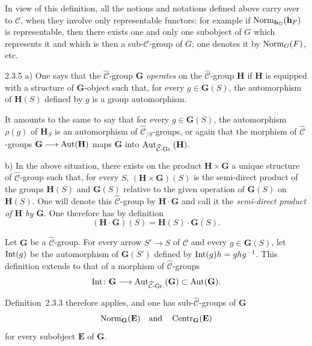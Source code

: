 In view of this definition, all the notions and notations defined above carry
over to \(\mathcal{C}\), when they involve only representable functors: for
example if \(\operatorname{Norm}_{\mathbf{h}_{G}}(\mathbf{h}_{F})\) is
representable, then there exists one and only one subobject of
\(G\) which represents it and which is then a
sub-\(\mathcal{C}\)-group of \(G\); one denotes it by
\(\operatorname{Norm}_{G}(F)\), etc.

\begin{definition}{2.3.5}\label{I.2.3.5}
a) One says that the \(\widehat{\mathcal{C}}\)-group \(\mathbf{G}\)
\emph{operates} on the \(\widehat{\mathcal{C}}\)-group \(\mathbf{H}\) if
\(\mathbf{H}\) is equipped with a structure of \(\mathbf{G}\)-object such
that, for every \(g\in\mathbf{G}(S)\), the automorphism of \(\mathbf{H}(S)\)
defined by \(g\) is a group automorphism.

It amounts to the same to say that for every \(g\in\mathbf{G}(S)\), the
automorphism \(\rho(g)\) of \(\mathbf{H}_{S}\) is an automorphism of
\(\widehat{\mathcal{C}}_{/S}\)-groups, or again that the morphism of
\(\widehat{\mathcal{C}}\)-groups
\(\mathbf{G}\longrightarrow\operatorname{Aut}(\mathbf{H})\) maps \(\mathbf{G}\) into
\(\operatorname{Aut}_{\widehat{\mathcal{C}}\text{-Gr.}}(\mathbf{H})\).

b) In the above situation, there exists on the product
\(\mathbf{H}\times\mathbf{G}\) a unique structure of
\(\widehat{\mathcal{C}}\)-group such that, for every \(S\),
\((\mathbf{H}\times\mathbf{G})(S)\) is the semi-direct product of the groups
\(\mathbf{H}(S)\) and \(\mathbf{G}(S)\) relative to the given operation of
\(\mathbf{G}(S)\) on \(\mathbf{H}(S)\). One will denote this
\(\widehat{\mathcal{C}}\)-group by \(\mathbf{H}\cdot\mathbf{G}\) and call it
the \emph{semi-direct product of \(\mathbf{H}\) by \(\mathbf{G}\)}. One
therefore has by definition
\[
(\mathbf{H}\cdot\mathbf{G})(S)=\mathbf{H}(S)\cdot\mathbf{G}(S).
\]
\end{definition}

Let \(\mathbf{G}\) be a \(\widehat{\mathcal{C}}\)-group. For every arrow
\(S'\to S\) of \(\mathcal{C}\) and every \(g\in\mathbf{G}(S)\), let
\(\operatorname{Int}(g)\) be the automorphism of \(\mathbf{G}(S')\) defined by
\(\operatorname{Int}(g)h=ghg^{-1}\). This definition extends to that of a morphism of
\(\widehat{\mathcal{C}}\)-groups
\[
\operatorname{Int}\colon\mathbf{G}\longrightarrow
\operatorname{Aut}_{\widehat{\mathcal{C}}\text{-Gr.}}(\mathbf{G})
\subset\operatorname{Aut}(\mathbf{G}).
\]

Definition~2.3.3 therefore applies, and one has sub-\(\widehat{\mathcal{C}}\)-groups
of \(\mathbf{G}\)
\[
\operatorname{Norm}_{\mathbf{G}}(\mathbf{E})
\quad\text{and}\quad
\operatorname{Centr}_{\mathbf{G}}(\mathbf{E})
\]
for every subobject \(\mathbf{E}\) of \(\mathbf{G}\).


